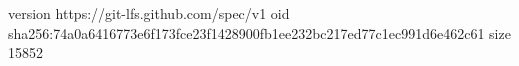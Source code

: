 version https://git-lfs.github.com/spec/v1
oid sha256:74a0a6416773e6f173fce23f1428900fb1ee232bc217ed77c1ec991d6e462c61
size 15852
